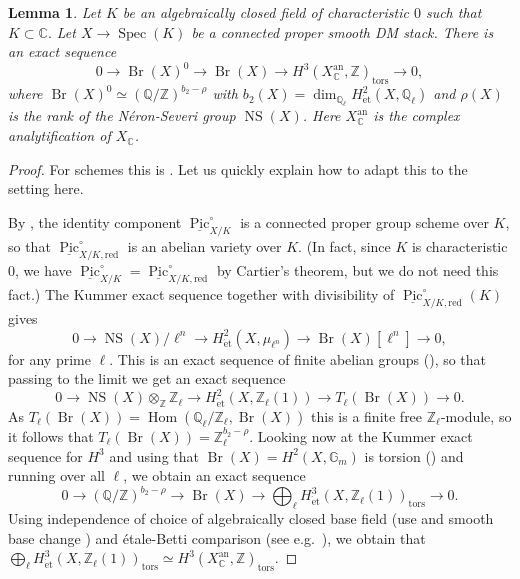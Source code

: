 \documentclass{amsart}
\newtheorem{lem}[prop]{Lemma}
\theoremstyle{definition}
\theoremstyle{remark}
\DeclareMathOperator{\Hom}{Hom}
\DeclareMathOperator{\Spec}{Spec}
\DeclareMathOperator{\Br}{Br}
\DeclareMathOperator{\tors}{tors}
\DeclareMathOperator{\Pic}{Pic}
\DeclareMathOperator{\NS}{NS}
\DeclareMathOperator{\an}{an}
\newcommand{\Q}{\mathbb{Q}}
\newcommand{\ZZ}{\mathbb Z}
\newcommand{\red}{\mathrm{red}}
\newcommand{\et}{\operatorname{\acute{e}t}}%
\begin{document}
\begin{lem}\label{lem: short exact sequence with H3}
    Let $K$ be an algebraically closed field of characteristic $0$ such that $K\subset \mathbb{C}.$
    Let $X\rightarrow \Spec(K)$ be a connected proper smooth DM stack. 
    There is an exact sequence
    \[
    0 \to \Br(X)^{0} \to \Br(X) \to H^{3}(X_{\mathbb{C}}^{\an},\ZZ)_{\tors} \to 0,
    \]
    where $\Br(X)^{0}\simeq (\Q/\ZZ)^{b_{2}-\rho}$ with $b_{2}(X)=\dim_{\Q_{\ell}}H^{2}_{\et}(X, \Q_{\ell})$ and $\rho(X)$ is the rank of the N\'eron-Severi group $\NS(X)$.
    Here $X_{\mathbb{C}}^{\an}$ is the complex analytification of $X_{\mathbb{C}}$.
\end{lem}
\begin{proof}
    For schemes this is \cite[Proposition 4.2.6 (ii), (iii)]{BrauerGrothendieckBook}. 
    Let us quickly explain how to adapt this to the setting here.
    
    By \cite[Théorème 4.3.1]{BrochardPicardFunctorStack},
    the identity component
    $\underline{\Pic}^{\circ}_{X/K}$ is a connected proper group scheme over $K$, so that $\underline{\Pic}^{\circ}_{X/K,\red}$ is an abelian variety over $K$.
    (In fact, since $K$ is characteristic $0$, we have $\underline{\Pic}^{\circ}_{X/K}=\underline{\Pic}^{\circ}_{X/K,\red}$ by Cartier's theorem, but we do not need this fact.)
    The Kummer exact sequence together with divisibility of $\underline{\Pic}^{\circ}_{X/K,\red}(K)$ gives
    \[
    0 \to \NS(X)/\ell^{n} \to H^{2}_{\et}(X,\mu_{\ell^{n}}) \to \Br(X)[\ell^{n}] \to 0,
    \]
    for any prime $\ell$. 
    This is an exact sequence of finite abelian groups (\cite[Theorem 9.10]{OlssonSheavesOnArtinStacks}), so that passing to the limit we get an exact sequence
    \[
    0 \to \NS(X)\otimes_{\ZZ} \ZZ_{\ell} \to H^{2}_{\et}(X,\ZZ_{\ell}(1)) \to T_{\ell}(\Br(X)) \to 0.
    \]
    As $T_{\ell}(\Br(X))=\Hom(\Q_{\ell}/\ZZ_{\ell},\Br(X))$ this is a finite free $\ZZ_{\ell}$-module, so it follows that $T_{\ell}(\Br(X))=\ZZ_{\ell}^{b_{2}-\rho}.$
    Looking now at the Kummer exact sequence for $H^{3}$ and using that $\Br(X)=H^{2}(X,\mathbb{G}_{m})$ is torsion (\cite[Proposition 2.5 (iii)]{AntieauMeierBrauerElliptic}) and running over all $\ell$, we obtain an exact sequence
    \[
    0 \to (\Q/\ZZ)^{b_{2}-\rho} \to \Br(X) \to \bigoplus_{\ell} H^{3}_{\et}(X,\ZZ_{\ell}(1))_{\tors} \to 0.
    \]
    Using independence of choice of algebraically closed base field (use \cite[Tag 07BV]{stacks} and smooth base change \cite[Proposition 2.12]{ZhengEtCohoDM}) and étale-Betti comparison (see e.g.\ \cite[Proposition 4.1.6]{KubrakPrikhodkopHodgeStacks}), we obtain that
    $
    \bigoplus_{\ell} H^{3}_{\et}(X,\ZZ_{\ell}(1))_{\tors}\simeq H^{3}(X_{\mathbb{C}}^{\an},\ZZ)_{\tors}.
    $
\end{proof}
\end{document}
